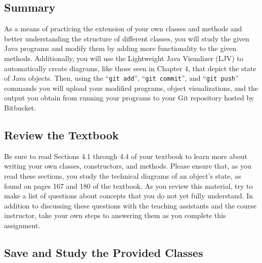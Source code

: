 



\vspace*{-.2in}
\subsection*{Summary}
\vspace*{-.05in}

As a means of practicing the extension of your own classes and methods and better understanding the structure of
different classes, you will study the given Java programs and modify them by adding more functionality to the given
methods.  Additionally, you will use the Lightweight Java Visualizer (LJV) to automatically create diagrams, like those
seen in Chapter 4, that depict the state of Java objects.  Then, using the ``{\tt git add}'', ``{\tt git commit}'', and
``{\tt git push}'' commands you will upload your modified programs, object visualizations, and the output you obtain
from running your programs to your Git repository hosted by Bitbucket.  

\vspace*{-.15in}
\subsection*{Review the Textbook}
\vspace*{-.05in}

Be sure to read Sections 4.1 through 4.4 of your textbook to learn more about writing your own classes, constructors, and
methods.  Please ensure that, as you read these sections, you study the technical diagrams of an object's state, as
found on pages 167 and 180 of the textbook. As you review this material, try to make a list of questions about concepts
that you do not yet fully understand.  In addition to discussing these questions with the teaching assistants and the
course instructor, take your own steps to answering them as you complete this assignment.

\vspace*{-.15in}
\subsection*{Save and Study the Provided Classes}
\vspace*{-.05in}

